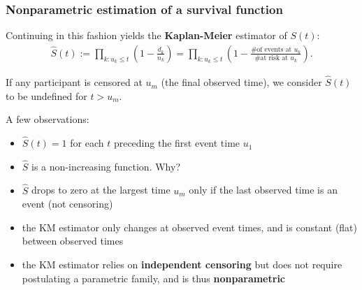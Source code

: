 \documentclass[10pt,t]{beamer}
\begin{document}
\begin{frame}
\frametitle{Nonparametric estimation of a survival function}
Continuing in this fashion yields the \textbf{Kaplan-Meier} estimator of $S(t)$: \vspace{-0.3cm}
\begin{align*}
\widehat{S}(t) := \prod_{k: u_k \leq t} \left(1 - \frac{d_k}{n_k} \right) = \prod_{k: u_k \leq t} \left(1 - \frac{\text{\# of events at $u_k$}}{\text{\# at risk at $u_k$}} \right) .
\end{align*}

If any participant is censored at $u_m$ (the final observed time), we consider $\widehat{S}(t)$ to be undefined for $t > u_m$. 

A few observations:
\begin{itemize}
\item $\widehat{S}(t) = 1$ for each $t$ preceding the first event time $u_1$ \pause
\item $\widehat{S}$ is a non-increasing function. Why? \pause
\item $\widehat{S}$ drops to zero at the largest time $u_m$ only if the last observed time is an event (not censoring) \pause
\item the KM estimator only changes at observed event times, and is constant (flat) between observed times \pause
\item the KM estimator relies on \textbf{independent censoring} but does not require postulating a parametric family, and is thus \textbf{nonparametric}
\end{itemize}
\end{frame}
\end{document}

